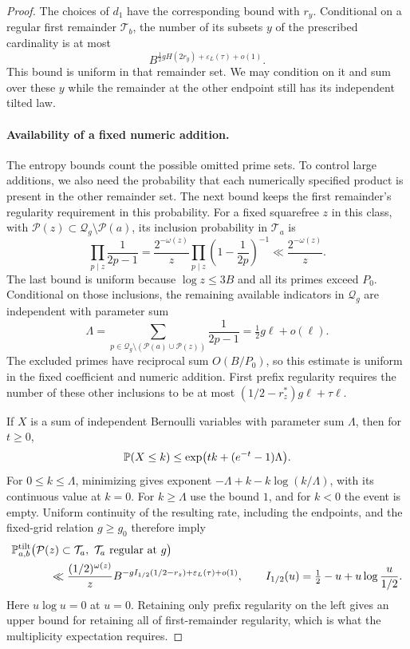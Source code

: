 \begin{proof}
The choices of $d_1$ have the corresponding bound with $r_y$.
Conditional on a regular first remainder $\mathcal T_b$, the number
of its subsets $y$ of the prescribed cardinality is at most
\[
 B^{\frac12 gH(2r_y)+\varepsilon_L(\tau)+o(1)}.
\]
This bound is uniform in that remainder set.  We may condition on it
and sum over these $y$ while the remainder at the other endpoint still
has its independent tilted law.

\paragraph{Availability of a fixed numeric addition.}
The entropy bounds count the possible omitted prime sets. To control
large additions, we also need the probability that each numerically
specified product is present in the other remainder set. The next bound
keeps the first remainder's regularity requirement in this probability.
For a fixed squarefree $z$ in this class, with
$\mathcal P(z)\subset\mathcal Q_g\setminus\mathcal P(a)$, its inclusion
probability in $\mathcal T_a$ is
\[
 \prod_{p\mid z}\frac1{2p-1}
 =\frac{2^{-\omega(z)}}{z}
       \prod_{p\mid z}\left(1-\frac1{2p}\right)^{-1}
 \ll \frac{2^{-\omega(z)}}{z}.
\]
The last bound is uniform because $\log z\le3B$ and all its primes
exceed $P_0$.  Conditional on those inclusions, the remaining available
indicators in $\mathcal Q_g$ are independent with parameter sum
\[
 \Lambda=\sum_{p\in\mathcal Q_g\setminus
                       (\mathcal P(a)\cup\mathcal P(z))}
                       \frac1{2p-1}
         =\tfrac12g\ell+o(\ell).
\]
The excluded primes have reciprocal sum $O(B/P_0)$, so this estimate
is uniform in the fixed coefficient and numeric addition.  First
prefix regularity requires the number of these other inclusions to be
at most $(1/2-r_z^*)g\ell+\tau\ell$.

If $X$ is a sum of independent Bernoulli variables with parameter sum
$\Lambda$, then for $t\ge0$,
\[
 \mathbb P(X\le k)
 \le\exp\bigl(tk+(e^{-t}-1)\Lambda\bigr).
\]
For $0\le k\le\Lambda$, minimizing gives exponent
$-\Lambda+k-k\log(k/\Lambda)$, with its continuous value at $k=0$.
For $k\ge\Lambda$ use the bound $1$, and for $k<0$ the event is empty.
Uniform continuity of the resulting rate, including the endpoints,
and the fixed-grid relation $g\ge g_0$ therefore imply
\begin{equation}
 \begin{split}
 &\Prob^{\mathrm{tilt}}_{a,b}
   \bigl(\mathcal P(z)\subset\mathcal T_a,
              \ \mathcal T_a\text{ regular at }g\bigr)\\
 &\hspace{12mm}\ll
   \frac{(1/2)^{\omega(z)}}{z}
       B^{-gI_{1/2}(1/2-r_z)+\varepsilon_L(\tau)+o(1)},
 \qquad
 I_{1/2}(u)=\tfrac12-u+u\log\frac{u}{1/2}.
 \end{split}
 \label{eq:27}
\end{equation}
Here $u\log u=0$ at $u=0$.  Retaining only prefix regularity on the
left gives an upper bound for retaining all of first-remainder
regularity, which is what the multiplicity expectation requires.


\end{proof}
